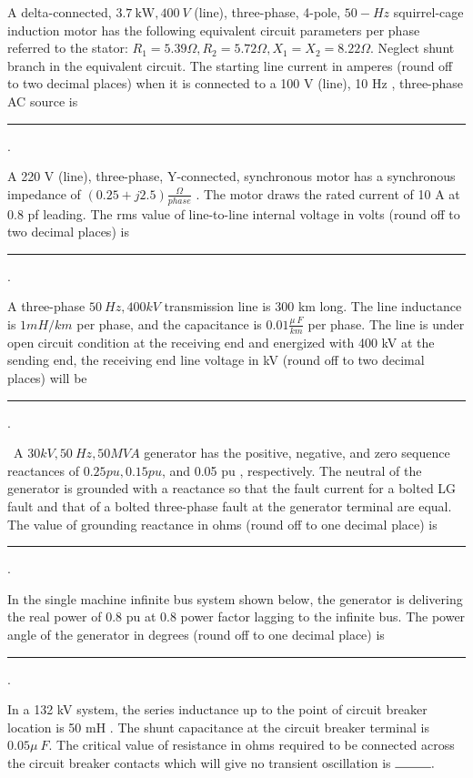   
  \item A delta-connected, $3.7 \mathrm{~kW}, 400 {~V}$ (line), three-phase, 4-pole, $50-{Hz}$ squirrel-cage induction motor has the following equivalent circuit parameters per phase referred to the stator: $R_{1}=5.39 \Omega, R_{2}=5.72 \Omega, X_{1}=X_{2}=8.22 \Omega$. Neglect shunt branch in the equivalent circuit. The starting line current in amperes (round off to two decimal places) when it is connected to a 100 V (line), 10 Hz , three-phase AC source is \rule{1cm}{0.15mm} .
   \hfill{}
\item A 220 V (line), three-phase, Y-connected, synchronous motor has a synchronous impedance of $(0.25+j 2.5) \frac{\Omega}{phase} $ . The motor draws the rated current of 10 A at 0.8 pf leading. The rms value of line-to-line internal voltage in volts (round off to two decimal places) is
\rule{1cm}{0.15mm} .
\hfill{}
  \item  A three-phase $50 {~Hz}, 400 {kV}$ transmission line is 300 km long. The line inductance is $1 {mH} / {km}$ per phase, and the capacitance is $0.01 \frac{\mu {~F} }{ {km}}$ per phase. The line is under open circuit condition at the receiving end and energized with 400 kV at the sending end, the receiving end line voltage in kV (round off to two decimal places) will be \rule{1cm}{0.15mm} .
\hfill{}
  \item  {~A} $ 30 {kV}, 50 {~Hz}, 50 {MVA}$ generator has the positive, negative, and zero sequence reactances of $0.25 {pu}, 0.15 {pu}$, and 0.05 pu , respectively. The neutral of the generator is grounded with a reactance so that the fault current for a bolted LG fault and that of a bolted three-phase fault at the generator terminal are equal. The value of grounding reactance in ohms (round off to one decimal place) is \rule{1cm}{0.15mm} .
  \hfill{}
 \item In the single machine infinite bus system shown below, the generator is delivering the real power of 0.8 pu at 0.8 power factor lagging to the infinite bus. The power angle of the generator in degrees (round off to one decimal place) is  \rule{1cm}{0.15mm} . 
 
 \hfill{}
  
\item  In a 132 kV system, the series inductance up to the point of circuit breaker location is 50 mH . The shunt capacitance at the circuit breaker terminal is $0.05 \mu {~F}$. The critical value of resistance in ohms required to be connected across the circuit breaker contacts which will give no transient oscillation is $\rule{1cm}{0.15mm} . $ 
\hfill{}


